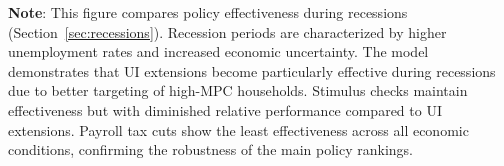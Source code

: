 \documentclass[\PathToRoot/\ProjectName]{subfiles}
\begin{document}
\noindent\parbox{\textwidth}{\footnotesize
  \textbf{Note}: This figure compares policy effectiveness during recessions (Section~\ref{sec:recessions}).
  Recession periods are characterized by higher unemployment rates and increased economic uncertainty.
  The model demonstrates that UI extensions become particularly effective during recessions due to
  better targeting of high-MPC households. Stimulus checks maintain effectiveness but with diminished
  relative performance compared to UI extensions. Payroll tax cuts show the least effectiveness
  across all economic conditions, confirming the robustness of the main policy rankings.
}

\vspace{1em}
\FloatBarrier 

\smartbib
\end{document}
